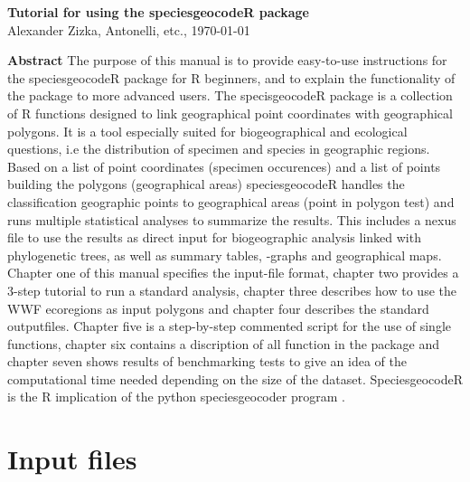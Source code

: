 \documentclass[a4paper,titlepage,11pt]{scrreprt}
\begin{document}
\begin{titlepage}
\vspace*{1cm}
\begin{center}
\huge
\textbf{Tutorial for using the speciesgeocodeR package}\\
\vspace{1cm}
\Large {Alexander Zizka, Antonelli, etc.,  \today} \\
\end{center}

\vspace{1.5cm}
\Large

\normalsize

\textbf{Abstract} The purpose of this manual is to provide easy-to-use instructions for the speciesgeocodeR package for R beginners, and to explain the functionality of the package to more advanced users. The specisgeocodeR package is a collection of R functions designed to link geographical point coordinates with geographical polygons. It is a tool especially suited for biogeographical and ecological questions, i.e the distribution of specimen and species in geographic regions. Based on a list of point coordinates (specimen occurences) and a list of points building the polygons (geographical areas) speciesgeocodeR handles the classification geographic points to geographical areas (point in polygon test) and runs multiple statistical analyses to summarize the results. This includes a nexus file to use the results as direct input for biogeographic analysis linked with phylogenetic trees, as well as summary tables, -graphs and geographical maps. Chapter one of this manual specifies the input-file format, chapter two provides a 3-step tutorial to run a standard analysis, chapter three describes how to use the WWF ecoregions as input polygons and chapter four describes the standard outputfiles. Chapter five is a step-by-step commented script for the use of single functions, chapter six contains a discription of all function in the package and chapter seven shows results of benchmarking tests to give an idea of the computational time needed depending on the size of the dataset. SpeciesgeocodeR is the R implication of the python speciesgeocoder program \citep{XXX}.


\end{titlepage}

\tableofcontents

\chapter{Input files}
\end{document}
